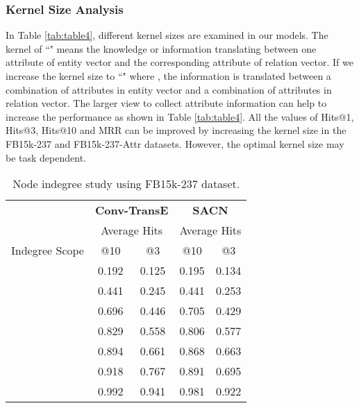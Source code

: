 \documentclass[letterpaper]{article} \usepackage{aaai19}  \usepackage{times}  \usepackage{helvet}  \usepackage{courier}  \usepackage{url}  \usepackage{graphicx}  \usepackage{amsmath}
\begin{document}
\subsubsection{Kernel Size Analysis}

In Table \ref{tab:table4}, different kernel sizes are examined in our models. The kernel of ``" means the knowledge or information translating between one attribute of entity vector and the corresponding attribute of relation vector. 
If we increase the kernel size to ``" where , the information is translated between a combination of  attributes in entity vector and a combination of  attributes in relation vector. The larger view to collect attribute information can help to increase the performance as shown in Table \ref{tab:table4}. All the values of Hits@1, Hits@3, Hits@10 and MRR can be improved by increasing the kernel size in the FB15k-237 and FB15k-237-Attr datasets. However, the optimal kernel size may be task dependent.


\begin{table}
\caption{Node indegree study using FB15k-237 dataset.}
    \bigskip
    \label{tab:table5}
    \tabcolsep=0.25cm
    \centering
    \begin{tabular}{c|c|c|c|c}
        \hline
         & \multicolumn{2}{c|}{\textbf{Conv-TransE}}& \multicolumn{2}{c}{\textbf{SACN}} \\
        \cline{2-5}
         & \multicolumn{2}{c|}{Average Hits} & \multicolumn{2}{c}{Average Hits}  \\
        \cline{2-5}
         Indegree Scope & @10 & @3 & @10 & @3  \\
        \hline
        \hline
         [0,100] & 0.192 & 0.125 & 0.195 & 0.134 \\
        \hline
         [100,200] & 0.441 & 0.245 & 0.441 & 0.253  \\
        \hline
         [200,300] & 0.696 & 0.446 & 0.705 & 0.429  \\
        \hline
        [300,400]  & 0.829 & 0.558 &0.806 & 0.577  \\
\hline
        [400,500] & 0.894 & 0.661 & 0.868 & 0.663  \\
        \hline
        [500,1000]  & 0.918 & 0.767 & 0.891 & 0.695  \\
        \hline
        [1000, maximum]& 0.992 & 0.941 & 0.981 & 0.922\\
        \hline
\end{tabular}
\end{table}
\end{document}
